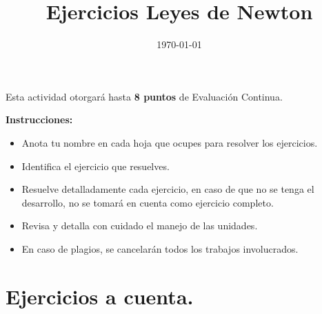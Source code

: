 \documentclass[14pt]{extarticle}
\title{\vspace*{-2cm} Ejercicios Leyes de Newton\vspace{-5ex}}
\date{\today}
\begin{document}
\maketitle

Esta actividad otorgará hasta \textbf{8 puntos} de Evaluación Continua.
\vspace*{0.5cm}

\textbf{Instrucciones: }
\begin{itemize}
\item Anota tu nombre en cada hoja que ocupes para resolver los ejercicios.
\item Identifica el ejercicio que resuelves.
\item Resuelve detalladamente cada ejercicio, en caso de que no se tenga el desarrollo, no se tomará en cuenta como ejercicio completo.
\item Revisa y detalla con cuidado el manejo de las unidades.
\item En caso de plagios, se cancelarán todos los trabajos involucrados.
\end{itemize}

\section{Ejercicios a cuenta.}
\end{document}
